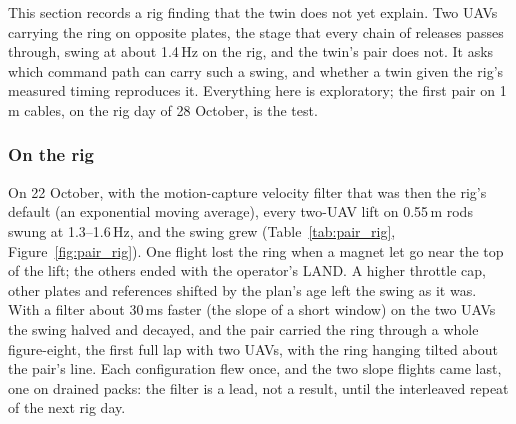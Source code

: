 This section records a rig finding that the twin does not yet explain. Two UAVs carrying the ring on opposite plates,
the stage that every chain of releases passes through, swing at about 1.4\,Hz on the rig, and the twin's pair does
not. It asks which command path can carry such a swing, and whether a twin given the rig's measured timing reproduces
it. Everything here is exploratory; the first pair on 1\,m cables, on the rig day of 28 October, is the test.

\subsubsection{On the rig}

On 22 October, with the motion-capture velocity filter that was then the rig's default (an exponential moving average),
every two-UAV lift on 0.55\,m rods swung at 1.3--1.6\,Hz, and the swing grew (Table~\ref{tab:pair_rig},
Figure~\ref{fig:pair_rig}). One flight lost the ring when a magnet let go near the top of the lift; the others ended
with the operator's LAND. A higher throttle cap, other plates and references shifted by the plan's age left the swing
as it was. With a filter about 30\,ms faster (the slope of a short window) on the two UAVs the swing halved and
decayed, and the pair carried the ring through a whole figure-eight, the first full lap with two UAVs, with the ring
hanging tilted about the pair's line. Each configuration flew once, and the two slope flights came last, one on drained
packs: the filter is a lead, not a result, until the interleaved repeat of the next rig day.

